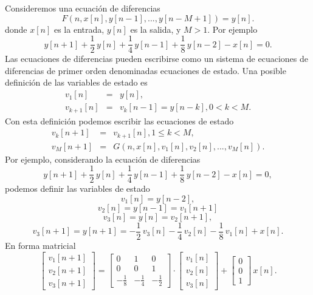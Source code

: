 Consideremos una ecuaci\'{o}n de diferencias
\begin{equation}
  F(n, x[n], y[n-1],..., y[n-M+1]) = y[n]. 
\end{equation}
donde $x[n]$ es la entrada, $y[n]$ es la salida, y $M > 1$.
Por ejemplo
\begin{equation}
y[n+1] + \frac{1}{2} \, y[n] + \frac{1}{4} \, y[n-1] + \frac{1}{8} \, y[n-2] - x[n] = 0.
\end{equation}
Las ecuaciones de diferencias pueden
escribirse como un sistema de ecuaciones de diferencias de primer orden
denominadas ecuaciones de estado. Una posible definici\'{o}n de las
variables de estado es
\begin{eqnarray}
  v_{1}[n]   &=& y[n],                                               \\
  v_{k+1}[n] &=& v_{k}[n-1] = y[n-k],  0 < k < M .
\end{eqnarray}
Con esta definici\'{o}n podemos escribir las ecuaciones de estado
\begin{eqnarray}
  v_{k}[n+1] &=& v_{k+1}[n],  1 \leq k < M,  \\
  v_{M}[n+1] &=& G(n, x[n], v_{1}[n], v_{2}[n],...,v_{M}[n]).
\end{eqnarray}
Por ejemplo, considerando la ecuación de diferencias
\begin{equation}
y[n+1] + \frac{1}{2} \, y[n] + \frac{1}{4} \, y[n-1] + \frac{1}{8} \, y[n-2] - x[n] = 0,
\end{equation}
podemos definir las variables de estado
\begin{equation}
v_{1}[n] = y[n-2],
\end{equation}
\begin{equation}
v_{2}[n] = y[n-1] = v_{1}[n+1]
\end{equation}
\begin{equation}
v_{3}[n] = y[n] = v_{2}[n+1],
\end{equation}
\begin{equation}
v_{3}[n+1] = y[n+1] = - \frac{1}{2} \, v_{3}[n] - \frac{1}{4} \, v_{2}[n] - \frac{1}{8} \, v_{1}[n] + x[n].
\end{equation}
En forma matricial
\begin{equation}
\left[ \begin{array}{c}
v_{1}[n+1] \\
v_{2}[n+1] \\
v_{3}[n+1]
\end{array} \right] 
= \left[ \begin{array}{ccc}
0 & 1 & 0 \\
0 & 0 & 1 \\
-\frac{1}{8} & -\frac{1}{4} & -\frac{1}{2}
\end{array} \right] \cdot
\left[ \begin{array}{c}
v_{1}[n]\\
v_{2}[n]\\
v_{3}[n]
\end{array} \right]
+
\left[ \begin{array}{c}
0 \\
0 \\
1
\end{array} \right] \, x[n].
\end{equation}

